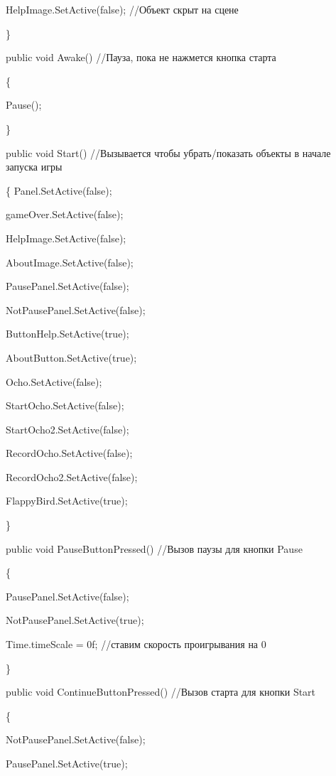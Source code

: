 \documentclass[14pt, oneside]{altsu-report}
\begin{document}
        HelpImage.SetActive(false); //Объект скрыт на сцене
        
    \}
    

    public void Awake() //Пауза, пока не нажмется кнопка старта
    
    \{
    
        Pause();
        
    \}

    public void Start() //Вызывается чтобы убрать/показать объекты в начале запуска игры 
    
    \{
        Panel.SetActive(false);
        
        gameOver.SetActive(false);
        
        HelpImage.SetActive(false);
        
        AboutImage.SetActive(false);

        PausePanel.SetActive(false);
        
        NotPausePanel.SetActive(false);
        
        ButtonHelp.SetActive(true);
        
        AboutButton.SetActive(true);

        Ocho.SetActive(false);
        
        StartOcho.SetActive(false);
        
        StartOcho2.SetActive(false);
        
        RecordOcho.SetActive(false);
        
        RecordOcho2.SetActive(false);
        
        FlappyBird.SetActive(true);


    \}

    
    public void PauseButtonPressed() //Вызов паузы для кнопки Pause
    
    \{
    
        PausePanel.SetActive(false); 
        
        NotPausePanel.SetActive(true);

        Time.timeScale = 0f; //ставим скорость проигрывания на 0
    
    \}

    public void ContinueButtonPressed() //Вызов старта для кнопки Start
    
    \{
    
        NotPausePanel.SetActive(false);
        
        PausePanel.SetActive(true);
        
\end{document}
